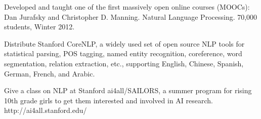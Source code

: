 \documentclass[11pt,letterpaper]{article}
\def\url#1{{\small\sf #1}}
\begin{document}
\begin{vita}
\begin{Synergistic Activities}
\item Developed and taught one of the first massively open online
  courses (MOOCs): Dan Jurafsky and Christopher D. Manning. Natural Language Processing. 70,000 students, Winter 2012.

\item Distribute Stanford CoreNLP, a widely used set of open source NLP tools for statistical parsing,
POS tagging, named entity recognition, coreference, word segmentation, relation extraction, etc., supporting English, Chinese, Spanish, German, French, and Arabic.

\item Give a class on NLP at Stanford ai4all/SAILORS, a summer program for rising 10th grade girls to get them 
interested and involved in AI research. \url{http://ai4all.stanford.edu/}




\end{Synergistic Activities}


\vspace*{24pt}

\vfill
\end{vita}
\end{document}
